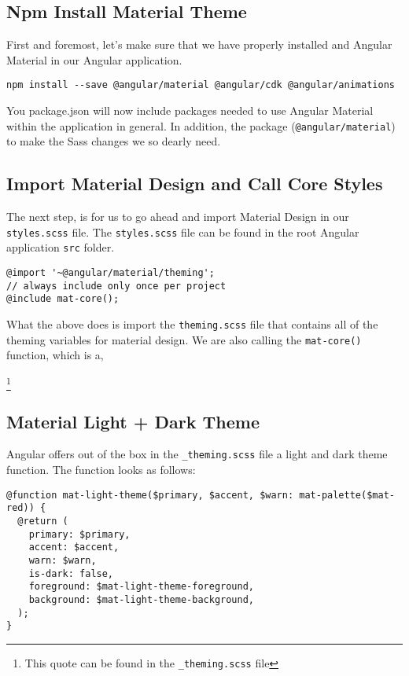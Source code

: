 \subsection{Npm Install Material Theme}
First and foremost, let's make sure that we have properly installed and Angular
Material in our Angular application. 
\begin{lstlisting}
npm install --save @angular/material @angular/cdk @angular/animations
\end{lstlisting}

You package.json will now include packages needed to use Angular Material 
within the application in general. In addition, the package
(\lstinline{@angular/material}) to make the Sass changes we so dearly need. 

\subsection{Import Material Design and Call Core Styles}
The next step, is for us to go ahead and import Material Design in our 
\lstinline{styles.scss} file. The \lstinline{styles.scss} file can be found
in the root Angular application \lstinline{src} folder.

\begin{lstlisting}[caption=styles.scss]
@import '~@angular/material/theming';
// always include only once per project
@include mat-core();
\end{lstlisting}


What the above does is import the \lstinline{theming.scss} file that contains
all of the theming variables for material design. We are also calling the
\lstinline{mat-core()} function, which is a, \begin{quote}
\end{quote} \footnote{This quote can be found in the \lstinline{_theming.scss}
file}

\subsection{Material Light + Dark Theme}
Angular offers out of the box in the \lstinline{_theming.scss} file a light and
dark theme function. The function looks as follows: 
\begin{lstlisting}
@function mat-light-theme($primary, $accent, $warn: mat-palette($mat-red)) {
  @return (
    primary: $primary,
    accent: $accent,
    warn: $warn,
    is-dark: false,
    foreground: $mat-light-theme-foreground,
    background: $mat-light-theme-background,
  );
}  
\end{lstlisting}

